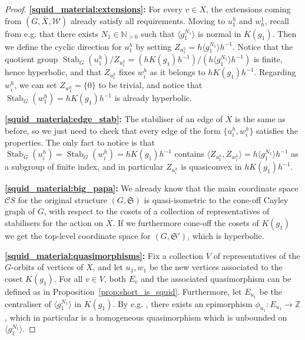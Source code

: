 \documentclass[svgnames]{amsart}
\theoremstyle{plain}
\theoremstyle{definition}
\newcommand{\Z}{\mathbb{Z}}
\newcommand{\frakS}{\mathfrak S}
\newcommand{\C}{\mathcal C}
\newcommand{\ov}[1]{\overline{#1}}
\newcommand{\Stab}[2]{\operatorname{Stab}_{#1}(#2)}
\newcommand{\W}{\mathcal{W}}
\begin{document}
\begin{proof}
\textbf{\eqref{squid_material:extensions}:} For every $v\in \ov{X}$, the extensions coming from $(G, \ov X, \W)$ already satisfy all requirements. Moving to $u^h_1$ and $w_h^1$, recall from e.g. \cite[Corollary 6.6]{DGO} that there exists $N_1\in\mathbb{N}_{>0}$ such that $\langle g_1^{N_1}\rangle $ is normal in $K(g_1)$. Then we define the cyclic direction for $u^h_1$ by setting $Z_{u^h_1}=h\langle g_1^{N_1}\rangle h^{-1}$. Notice that the quotient group $\Stab{G}{u^h_1}/Z_{u^h_1}=(hK(g_1)h^{-1})/(h\langle g_1^{N_1}\rangle h^{-1})$ is finite, hence hyperbolic, and that $Z_{u^h_1}$ fixes $w^h_i$ as it belongs to $hK(g_1)h^{-1}$. Regarding $w^h_i$, we can set $Z_{w^h_1}=\{0\}$ to be trivial, and notice that $\Stab{G}{w^h_1}=hK(g_1)h^{-1}$ is already hyperbolic.
\par\medskip

\textbf{\eqref{squid_material:edge_stab}:} The stabiliser of an edge of $\ov X$ is the same as before, so we just need to check that every edge of the form $\{u^h_i, w^h_i\}$ satisfies the properties. The only fact to notice is that $\Stab{G}{u^h_i}=\Stab{G}{w^h_i}=hK(g_1)h^{-1}$ contains $\langle Z_{u^h_1}, Z_{w^h_1}\rangle=h\langle g_1^{N_1}\rangle h^{-1}$ as a subgroup of finite index, and in particular $Z_{u^h_i}$ is quasiconvex in $hK(g_1)h^{-1}$.
\par\medskip

\textbf{\eqref{squid_material:big_papa}:} We already know that the main coordinate space $\C S$ for the original structure $(G,\frakS)$ is quasi-isometric to the cone-off Cayley graph of $G$, with respect to the cosets of a collection of representatives of  stabilisers for the action on $\ov X$. If we furthermore cone-off the cosets of $K(g_1)$ we get the top-level coordinate space for $(G,\frakS')$, which is hyperbolic.
\par\medskip

\textbf{\eqref{squid_material:quasimorphisms}:} Fix a collection $V$ of representatives of the $G$-orbits of vertices of $\ov X$, and let $u_1, w_1$ be the new vertices associated to the coset $K(g_1)$. For all $v\in V$, both $E_v$ and the associated quasimorphism can be defined as in Proposition~\ref{prop:short_is_squid}. Furthermore, let $E_{u_1}$ be the centraliser of $\langle g_1^{N_1}\rangle$ in $K(g_1)$. By e.g. \cite[Lemma 3.2]{Macpherson_virtcyclic}, there exists an epimorphism $\phi_{u_1}\colon E_{u_1}\to \Z$, which in particular is a homogeneous quasimorphism which is unbounded on $\langle g_1^{N_1}\rangle$.
\par\medskip


\end{proof}
\end{document}
